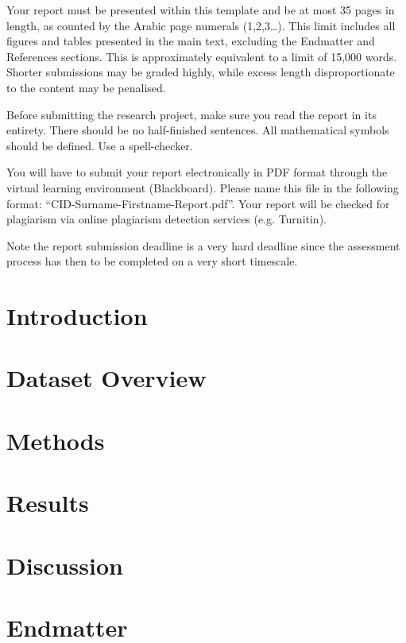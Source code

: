 \documentclass{statsmsc}
\begin{document}
Your report must be presented within this template and be at most 35 pages in length, as counted by the Arabic page numerals (1,2,3…). This limit includes all figures and tables presented in the main text, excluding the Endmatter and References sections. This is approximately equivalent to a limit of 15,000 words. Shorter submissions may be graded highly, while excess length disproportionate to the content may be penalised.


Before submitting the research project, make sure you read the report in its entirety. There should be no half-finished sentences. All mathematical symbols should be defined. Use a spell-checker.

You will have to submit your report electronically in PDF format through the virtual learning environment (Blackboard). Please name this file in the following format: “CID-Surname-Firstname-Report.pdf”. Your report will be checked for plagiarism via online plagiarism detection services (e.g. Turnitin). 

Note the report submission deadline is a very hard deadline since the assessment process has then to be completed on a very short timescale.
\section{Introduction}

\section{Dataset Overview}

\section{Methods}\label{sec:methods}

\section{Results}
\label{sec:results}


\section{Discussion}



\section*{Endmatter} \label{sec:endmatter}

\end{document}

